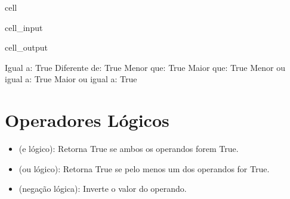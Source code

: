 \documentclass[letterpaper,10pt,english]{jupyterBook}
\begin{document}
\begin{sphinxuseclass}{cell}
\begin{sphinxVerbatimInput}
\begin{sphinxuseclass}{cell_input}
\end{sphinxuseclass}\end{sphinxVerbatimInput}
\begin{sphinxVerbatimOutput}

\begin{sphinxuseclass}{cell_output}
\begin{sphinxVerbatim}[commandchars=\\\{\}]
Igual a: True
Diferente de: True
Menor que: True
Maior que: True
Menor ou igual a: True
Maior ou igual a: True
\end{sphinxVerbatim}

\end{sphinxuseclass}\end{sphinxVerbatimOutput}

\end{sphinxuseclass}

\section{Operadores Lógicos}
\label{\detokenize{chapters/ch3/ch3:operadores-logicos}}\begin{itemize}
\item {} 
\sphinxAtStartPar
{} (e lógico): Retorna True se ambos os operandos forem True.

\item {} 
\sphinxAtStartPar
{} (ou lógico): Retorna True se pelo menos um dos operandos for True.

\item {} 
\sphinxAtStartPar
{} (negação lógica): Inverte o valor do operando.

\end{itemize}
\end{document}
